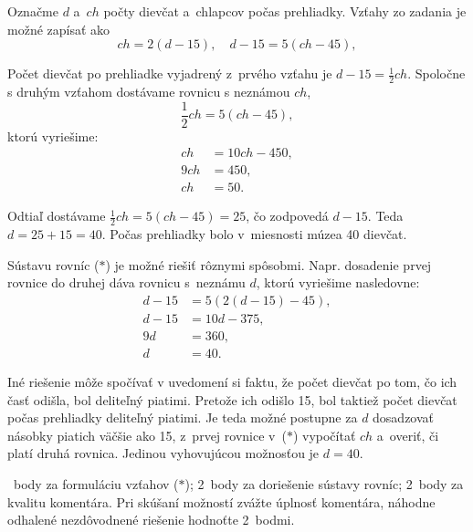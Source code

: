 {%
Označme $d$ a~$ch$ počty dievčat a~chlapcov počas prehliadky.
Vzťahy zo zadania je možné zapísať ako
$$
ch =2(d-15), \quad
d-15 =5(ch-45) ,
\tag{$*$}
$$

Počet dievčat po prehliadke vyjadrený z~prvého vzťahu je $d-15=\frac12 ch$.
Spoločne s druhým vzťahom dostávame rovnicu s neznámou $ch$,
$$
\frac12ch =5(ch-45),
$$
ktorú vyriešime:
$$
\begin{aligned}
	ch &=10ch-450, \\
	9ch &=450, \\
	ch &=50 .
\end{aligned}
$$

Odtiaľ dostávame $\frac12ch =5(ch-45) =25$, čo zodpovedá $d-15$.
Teda $d=25+15=40$.
Počas prehliadky bolo v~miesnosti múzea 40 dievčat.

\poznamky
Sústavu rovníc ($*$) je možné riešiť rôznymi spôsobmi.
Napr. dosadenie prvej rovnice do druhej dáva rovnicu s~neznámu $d$, ktorú vyriešime nasledovne:
$$
\begin{aligned}
	d-15 &= 5(2(d-15) -45), \\
	d-15 &= 10d -375, \\
	9d &= 360, \\
	d &=40.
\end{aligned}
$$

Iné riešenie môže spočívať v uvedomení si faktu, že počet dievčat po tom, čo ich časť odišla, bol deliteľný piatimi.
Pretože ich odišlo 15, bol taktiež počet dievčat počas prehliadky deliteľný piatimi.
Je teda možné postupne za $d$ dosadzovať násobky piatich väčšie ako 15, z~prvej rovnice v~($*$) vypočítať $ch$ a~overiť, či platí druhá rovnica.
Jedinou vyhovujúcou možnosťou je $d=40$.

~body za formuláciu vzťahov ($*$);
2~body za doriešenie sústavy rovníc;
2~body za kvalitu komentára.
Pri skúšaní možností zvážte úplnosť komentára,
náhodne odhalené nezdôvodnené riešenie hodnoťte 2~bodmi.
\endhodnotenie}

